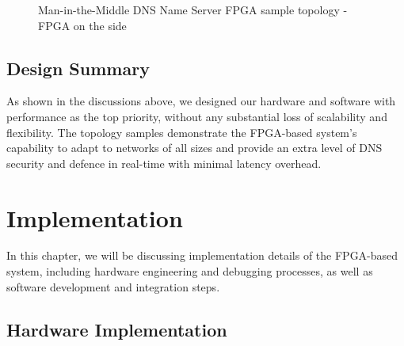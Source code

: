 \documentclass[a4paper]{report}
\begin{document}
\begin{figure}[H]
  \caption{Man-in-the-Middle DNS Name Server FPGA sample topology - FPGA on the side}
  \label{fig:dns-flood-man-in-the-middle-asic}
\end{figure}

\section{Design Summary}

As shown in the discussions above, we designed our hardware and software with performance as the top priority, without any substantial loss of scalability and flexibility. The topology samples demonstrate the FPGA-based system's capability to adapt to networks of all sizes and provide an extra level of DNS security and defence in real-time with minimal latency overhead.

\chapter{Implementation}

In this chapter, we will be discussing implementation details of the FPGA-based system, including hardware engineering and debugging processes, as well as software development and integration steps.

\section{Hardware Implementation}
\label{section:implementation-hardware-implementation}
\end{document}

